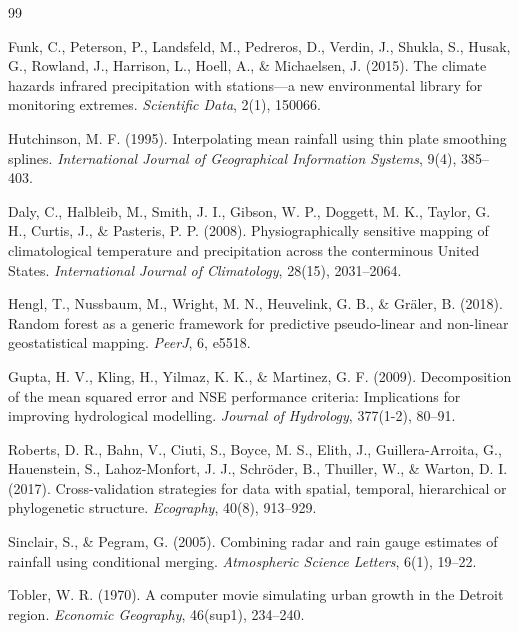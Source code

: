 \documentclass[11pt,a4paper]{article}
\begin{document}
\begin{thebibliography}{99}

Funk, C., Peterson, P., Landsfeld, M., Pedreros, D., Verdin, J., Shukla, S., Husak, G., Rowland, J., Harrison, L., Hoell, A., \& Michaelsen, J. (2015).
The climate hazards infrared precipitation with stations—a new environmental library for monitoring extremes.
\textit{Scientific Data}, 2(1), 150066.

Hutchinson, M. F. (1995).
Interpolating mean rainfall using thin plate smoothing splines.
\textit{International Journal of Geographical Information Systems}, 9(4), 385--403.

Daly, C., Halbleib, M., Smith, J. I., Gibson, W. P., Doggett, M. K., Taylor, G. H., Curtis, J., \& Pasteris, P. P. (2008).
Physiographically sensitive mapping of climatological temperature and precipitation across the conterminous United States.
\textit{International Journal of Climatology}, 28(15), 2031--2064.

Hengl, T., Nussbaum, M., Wright, M. N., Heuvelink, G. B., \& Gr{\"a}ler, B. (2018).
Random forest as a generic framework for predictive pseudo-linear and non-linear geostatistical mapping.
\textit{PeerJ}, 6, e5518.

Gupta, H. V., Kling, H., Yilmaz, K. K., \& Martinez, G. F. (2009).
Decomposition of the mean squared error and NSE performance criteria: Implications for improving hydrological modelling.
\textit{Journal of Hydrology}, 377(1-2), 80--91.

Roberts, D. R., Bahn, V., Ciuti, S., Boyce, M. S., Elith, J., Guillera-Arroita, G., Hauenstein, S., Lahoz-Monfort, J. J., Schr{\"o}der, B., Thuiller, W., \& Warton, D. I. (2017).
Cross-validation strategies for data with spatial, temporal, hierarchical or phylogenetic structure.
\textit{Ecography}, 40(8), 913--929.

Sinclair, S., \& Pegram, G. (2005).
Combining radar and rain gauge estimates of rainfall using conditional merging.
\textit{Atmospheric Science Letters}, 6(1), 19--22.

Tobler, W. R. (1970).
A computer movie simulating urban growth in the Detroit region.
\textit{Economic Geography}, 46(sup1), 234--240.

\end{thebibliography}
\end{document}
